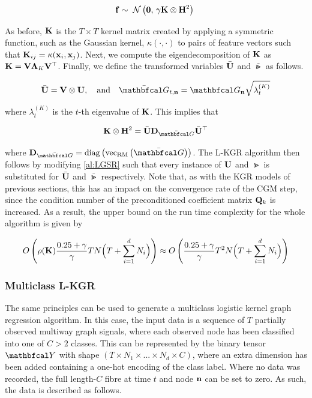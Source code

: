 \begin{equation}
    \mathbf{f} \sim \; \mathcal{N}\left(\mathbf{0}, \, \gamma \mathbf{K} \otimes \mathbf{H}^2\right) \;
\end{equation}

As before, $\mathbf{K}$ is the $T \times T$ kernel matrix created by applying a symmetric function, such as the Gaussian kernel, $\kappa(\cdot, \cdot)$ to pairs of feature vectors such that $\mathbf{K}_{ij} = \kappa(\mathbf{x}_i, \mathbf{x}_j)$. Next, we compute the eigendecomposition of $\mathbf{K}$ as $\mathbf{K} = \mathbf{V} \mathbf{\Lambda}_K \mathbf{V}^\top$. Finally, we define the transformed variables $\bar{\mathbf{U}}$ and $\bar{\Gt}$ as follows. 

\begin{equation}
    \label{eq:lkgr_substitution}
    \bar{\U}  = \V \otimes \U, \aand \bar{\Gt}_{t, \nn}  = \Gt_{\nn} \sqrt{\lambda_t^{(K)}}
\end{equation}

where $\lambda_t^{(K)}$ is the $t$-th eigenvalue of $\mathbf{K}$. This implies that 

\begin{equation}
    \K \otimes \HH^2 = \bar{\U} \D_{\bar{\Gt}} \bar{\U}^\top
\end{equation}

where $\D_{\bar{\Gt}} = \diag{\vecrm{\bar{\Gt}}}$. The L-KGR algorithm then follows by modifying \cref{al:LGSR} such that every instance of $\mathbf{U}$ and $\Gt$ is substituted for $\bar{\mathbf{U}}$ and $\bar{\Gt}$ respectively. Note that, as with the KGR models of previous sections, this has an impact on the convergence rate of the CGM step, since the condition number of the preconditioned coefficient matrix $\mathbf{Q}_k$ is increased. As a result, the upper bound on the run time complexity for the whole algorithm is given by 

\begin{equation*}
    O\left(\rho(\mathbf{K})\frac{0.25 + \gamma}{\gamma} TN \Big(T + \sum_{i=1}^d N_i\Big) \right)  \approx O\left( \frac{0.25 + \gamma}{\gamma} T^2 N \Big(T + \sum_{i=1}^d N_i\Big) \right) 
\end{equation*}

\subsubsection{Multiclass L-KGR}

The same principles can be used to generate a multiclass logistic kernel graph regression algorithm. In this case, the input data is a sequence of $T $ partially observed multiway graph signals, where each observed node has been classified into one of $C > 2$ classes. This can be represented by the binary tensor $\Yt$ with shape $(T \times N_1 \times ... \times N_d \times C)$, where an extra dimension has been added containing a one-hot encoding of the class label. Where no data was recorded, the full length-$C$ fibre at time $t$ and node $\mathbf{n}$ can be set to zero. As such, the data is described as follows. 

